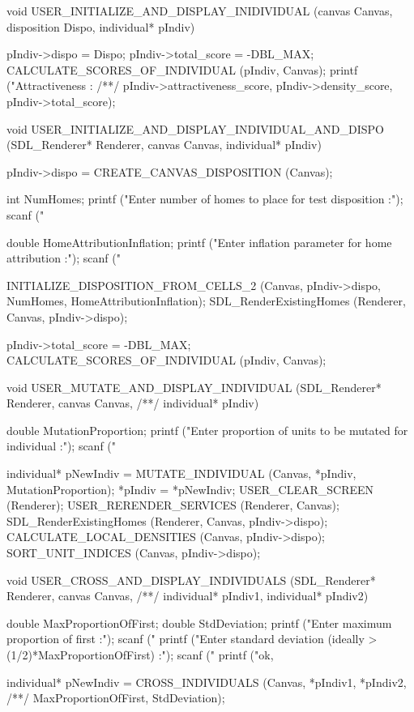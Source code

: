 \begin{C}
void USER_INITIALIZE_AND_DISPLAY_INIDIVIDUAL (canvas Canvas, disposition Dispo, individual* pIndiv){
	
	pIndiv->dispo = Dispo;
	pIndiv->total_score = -DBL_MAX;
	CALCULATE_SCORES_OF_INDIVIDUAL (pIndiv, Canvas);
	printf ("Attractiveness : %
	/**/ pIndiv->attractiveness_score, pIndiv->density_score, pIndiv->total_score);
}

void USER_INITIALIZE_AND_DISPLAY_INDIVIDUAL_AND_DISPO (SDL_Renderer* Renderer,
canvas Canvas, individual* pIndiv){
	
	pIndiv->dispo = CREATE_CANVAS_DISPOSITION (Canvas);
	
	int NumHomes;
	printf ("Enter number of homes to place for test disposition :\n");
	scanf ("%
	
	double HomeAttributionInflation;
	printf ("Enter inflation parameter for home attribution :\n");
	scanf ("%
	
	INITIALIZE_DISPOSITION_FROM_CELLS_2 (Canvas, pIndiv->dispo, NumHomes, HomeAttributionInflation);
	SDL_RenderExistingHomes (Renderer, Canvas, pIndiv->dispo);
	
	pIndiv->total_score = -DBL_MAX;
	CALCULATE_SCORES_OF_INDIVIDUAL (pIndiv, Canvas);
}


void USER_MUTATE_AND_DISPLAY_INDIVIDUAL (SDL_Renderer* Renderer, canvas Canvas,
/**/ individual* pIndiv){
	
	double MutationProportion;
	printf ("Enter proportion of units to be mutated for individual :\n");
	scanf ("%
	
	individual* pNewIndiv = MUTATE_INDIVIDUAL (Canvas, *pIndiv, MutationProportion);
	*pIndiv = *pNewIndiv;
	USER_CLEAR_SCREEN (Renderer);
	USER_RERENDER_SERVICES (Renderer, Canvas);
	SDL_RenderExistingHomes (Renderer, Canvas, pIndiv->dispo);
	CALCULATE_LOCAL_DENSITIES (Canvas, pIndiv->dispo);
	SORT_UNIT_INDICES (Canvas, pIndiv->dispo);
}


void USER_CROSS_AND_DISPLAY_INDIVIDUALS (SDL_Renderer* Renderer, canvas Canvas,
/**/ individual* pIndiv1, individual* pIndiv2){
	
	double MaxProportionOfFirst;
	double StdDeviation;
	printf ("Enter maximum proportion of first :\n");
	scanf ("%
	printf ("Enter standard deviation (ideally > (1/2)*MaxProportionOfFirst) :\n");
	scanf ("%
	printf ("ok, %
	
	individual* pNewIndiv = CROSS_INDIVIDUALS (Canvas, *pIndiv1, *pIndiv2,
	/**/ MaxProportionOfFirst, StdDeviation);
	
}
\end{C}
